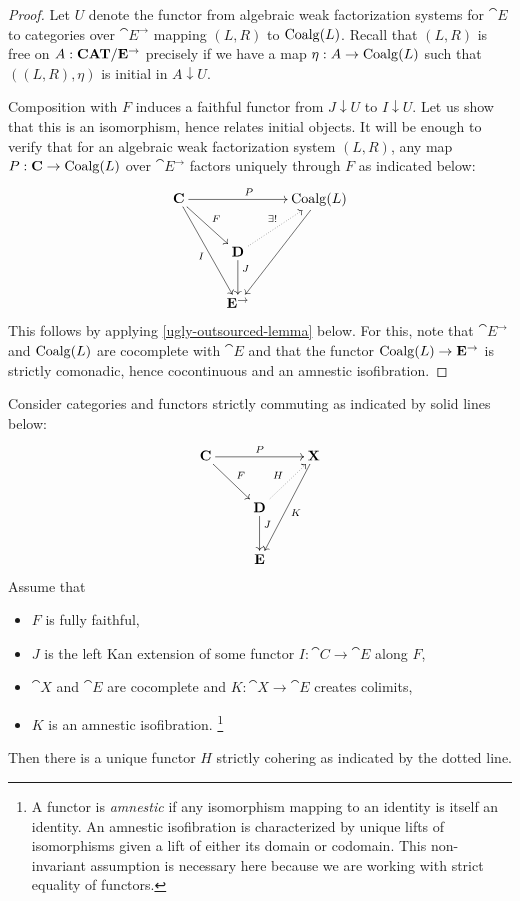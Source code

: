 \documentclass[reqno,10pt,a4paper,oneside]{amsart}
\begin{document}
\begin{proof}
Let $U$ denote the functor from algebraic weak factorization systems for $\cat{E}$ to categories over $\cat{E}^{\to}$ mapping $(L, R)$ to $\operatorname{Coalg}(L)$.
Recall that $(L, R)$ is free on $A : \mathbf{CAT}/\mathbf{E}^{\to}$ precisely if we have a map $\eta : A \to \operatorname{Coalg}(L)$ such that $((L, R), \eta)$ is initial in $A \downarrow U$.

Composition with $F$ induces a faithful functor from $J \downarrow U$ to $I \downarrow U$.
Let us show that this is an isomorphism, hence relates initial objects.
It will be enough to verify that for an algebraic weak factorization system $(L, R)$, any map $P : \mathbf{C} \to \operatorname{Coalg}(L)$ over $\cat{E}^{\to}$ factors uniquely through $F$ as indicated below:
\[
\xymatrix{
  \cat{C}
  \ar[rr]^{P}
  \ar[dr]^{F}
  \ar[ddr]_{I}
&&
  \Coalg(L)
  \ar[ddl]
\\&
  \cat{D}
  \ar@{.>}[ur]^{\exists !}
  \ar[d]^(0.3){J}
\\&
  \cat{E}^{\to}
}
\]
This follows by applying \cref{ugly-outsourced-lemma} below.
For this, note that $\cat{E}^{\to}$ and $\operatorname{Coalg}(L)$ are cocomplete with $\cat{E}$ and that the functor $\operatorname{Coalg}(L) \to \mathbf{E}^{\to}$ is strictly comonadic, hence cocontinuous and an amnestic isofibration.
\end{proof}

\begin{lemma}
\label{ugly-outsourced-lemma}
Consider categories and functors strictly commuting as indicated by solid lines below:
\[
\xymatrix{
  \cat{C}
  \ar[rr]^{P}
  \ar[dr]^{F}
&&
  \cat{X}
  \ar[ddl]^{K}
\\&
  \cat{D}
  \ar@{.>}[ur]^{H}
  \ar[d]^(0.3){J}
\\&
  \cat{E}
}
\]
Assume that
\begin{itemize}
\item
$F$ is fully faithful,
\item
$J$ is the left Kan extension of some functor $I : \cat{C} \to \cat{E}$ along $F$,
\item
$\cat{X}$ and $\cat{E}$ are cocomplete and $K : \cat{X} \to \cat{E}$ creates colimits,
\item
$K$ is an amnestic isofibration.%
\footnote{
  A functor is \emph{amnestic} if any isomorphism mapping to an identity is itself an identity.
  An amnestic isofibration is characterized by unique lifts of isomorphisms given a lift of either its domain or codomain.
  This non-invariant assumption is necessary here because we are working with strict equality of functors.
}
\end{itemize}
Then there is a unique functor $H$ strictly cohering as indicated by the dotted line.
\end{lemma}
\end{document}
